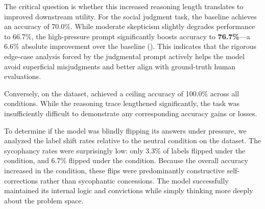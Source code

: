 The critical question is whether this increased reasoning length translates to improved downstream utility. For the \raio social judgment task, the \neutral baseline achieves an accuracy of 70.0\%. While moderate skepticism slightly degrades performance to 66.7\%, the high-pressure \judgmental prompt significantly boosts accuracy to \textbf{76.7\%}---a 6.6\% absolute improvement over the baseline (\increase). This indicates that the rigorous edge-case analysis forced by the judgmental prompt actively helps the model avoid superficial misjudgments and better align with ground-truth human evaluations. 

Conversely, on the \causalt dataset, \gptmini achieved a ceiling accuracy of 100.0\% across all conditions. While the reasoning trace lengthened significantly, the task was insufficiently difficult to demonstrate any corresponding accuracy gains or losses. 

To determine if the model was blindly flipping its answers under pressure, we analyzed the label shift rates relative to the neutral condition on the \raio dataset. The sycophancy rates were surprisingly low: only 3.3\% of labels flipped under the \skeptical condition, and 6.7\% flipped under the \judgmental condition. Because the overall accuracy increased in the \judgmental condition, these flips were predominantly constructive self-corrections rather than sycophantic concessions. The model successfully maintained its internal logic and convictions while simply thinking more deeply about the problem space.